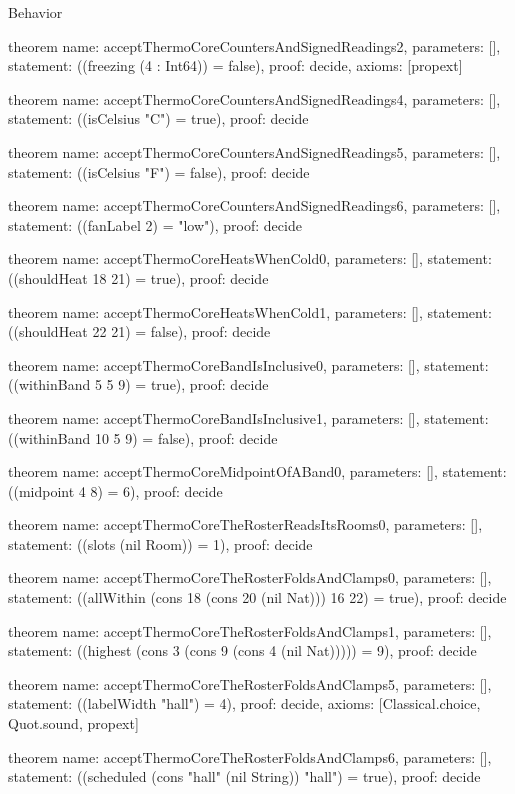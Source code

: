\begin{lexlean}{Behavior}
\begin{semanticmodule}
theorem{
  name: acceptThermoCoreCountersAndSignedReadings2,
  parameters: [],
  statement: ((freezing (4 : Int64)) = false),
  proof: decide{},
  axioms: [propext]
}

theorem{
  name: acceptThermoCoreCountersAndSignedReadings4,
  parameters: [],
  statement: ((isCelsius "C") = true),
  proof: decide{}
}

theorem{
  name: acceptThermoCoreCountersAndSignedReadings5,
  parameters: [],
  statement: ((isCelsius "F") = false),
  proof: decide{}
}

theorem{
  name: acceptThermoCoreCountersAndSignedReadings6,
  parameters: [],
  statement: ((fanLabel 2) = "low"),
  proof: decide{}
}

theorem{
  name: acceptThermoCoreHeatsWhenCold0,
  parameters: [],
  statement: ((shouldHeat 18 21) = true),
  proof: decide{}
}

theorem{
  name: acceptThermoCoreHeatsWhenCold1,
  parameters: [],
  statement: ((shouldHeat 22 21) = false),
  proof: decide{}
}

theorem{
  name: acceptThermoCoreBandIsInclusive0,
  parameters: [],
  statement: ((withinBand 5 5 9) = true),
  proof: decide{}
}

theorem{
  name: acceptThermoCoreBandIsInclusive1,
  parameters: [],
  statement: ((withinBand 10 5 9) = false),
  proof: decide{}
}

theorem{
  name: acceptThermoCoreMidpointOfABand0,
  parameters: [],
  statement: ((midpoint 4 8) = 6),
  proof: decide{}
}

theorem{
  name: acceptThermoCoreTheRosterReadsItsRooms0,
  parameters: [],
  statement: ((slots (nil Room)) = 1),
  proof: decide{}
}

theorem{
  name: acceptThermoCoreTheRosterFoldsAndClamps0,
  parameters: [],
  statement: ((allWithin (cons 18 (cons 20 (nil Nat))) 16 22) = true),
  proof: decide{}
}

theorem{
  name: acceptThermoCoreTheRosterFoldsAndClamps1,
  parameters: [],
  statement: ((highest (cons 3 (cons 9 (cons 4 (nil Nat))))) = 9),
  proof: decide{}
}

theorem{
  name: acceptThermoCoreTheRosterFoldsAndClamps5,
  parameters: [],
  statement: ((labelWidth "hall") = 4),
  proof: decide{},
  axioms: [Classical.choice, Quot.sound, propext]
}

theorem{
  name: acceptThermoCoreTheRosterFoldsAndClamps6,
  parameters: [],
  statement: ((scheduled (cons "hall" (nil String)) "hall") = true),
  proof: decide{}
}


\end{semanticmodule}
\end{lexlean}
